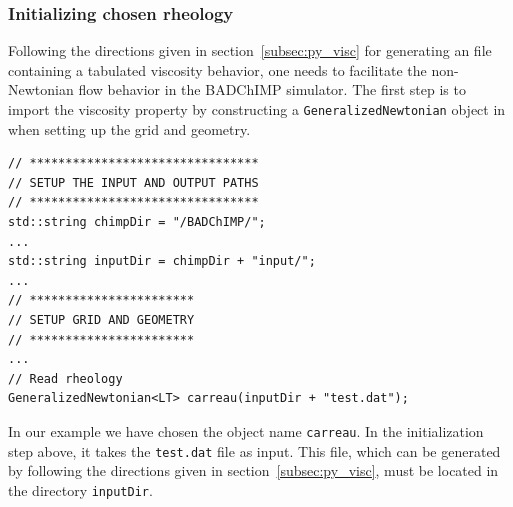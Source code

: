 \documentclass[11pt,a4paper]{report}
\begin{document}
\subsubsection{Initializing chosen rheology}
Following the directions given in section~\ref{subsec:py_visc} for generating an file containing a tabulated viscosity behavior, one needs to facilitate the non-Newtonian flow behavior in the BADChIMP simulator. The first step is to import the viscosity property by constructing a \texttt{GeneralizedNewtonian} object in when setting up the grid and geometry.   
\begin{verbatim}
// ********************************
// SETUP THE INPUT AND OUTPUT PATHS
// ********************************
std::string chimpDir = "/BADChIMP/";
...
std::string inputDir = chimpDir + "input/";
...
// ***********************
// SETUP GRID AND GEOMETRY
// ***********************
...
// Read rheology
GeneralizedNewtonian<LT> carreau(inputDir + "test.dat");
\end{verbatim}
In our example we have chosen the object name \texttt{carreau}. In the initialization step above, it takes the \texttt{test.dat} file as input. This file, which can be generated by following the directions given in section~\ref{subsec:py_visc}, must be located in the directory \texttt{inputDir}.
\end{document}
